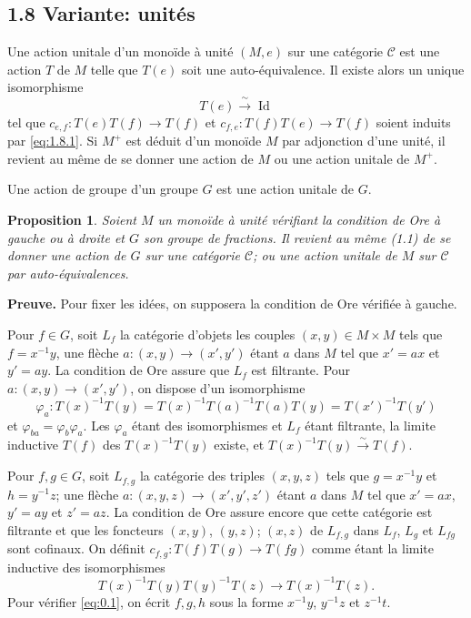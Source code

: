 \documentclass[11pt,a4paper]{article}
\theoremstyle{plain}
\newtheorem{proposition}[theorem]{Proposition}
\theoremstyle{definition}
\newcommand{\cC}{\mathscr{C}}
\begin{document}
\subsection*{1.8 Variante: unit\'es}

Une action unitale d'un mono\"ide \`a unit\'e $(M, e)$ sur une cat\'egorie $\cC$ est une action $T$ de $M$ telle que $T(e)$ soit une auto-\'equivalence. Il existe alors un unique isomorphisme
\begin{equation}\label{eq:1.8.1}
T(e) \xrightarrow{\;\sim\;} \operatorname{Id}
\tag{1.8.1}
\end{equation}
tel que $c_{e,f} : T(e)T(f) \to T(f)$ et $c_{f,e} : T(f)T(e) \to T(f)$ soient induits par \eqref{eq:1.8.1}. Si $M^+$ est d\'eduit d'un mono\"ide $M$ par adjonction d'une unit\'e, il revient au m\^eme de se donner une action de $M$ ou une action unitale de $M^+$.

Une action de groupe d'un groupe $G$ est une action unitale de $G$.

\begin{proposition}\label{prop:1.9}
Soient $M$ un mono\"ide \`a unit\'e v\'erifiant la condition de Ore \`a gauche ou \`a droite et $G$ son groupe de fractions. Il revient au m\^eme \textup{(1.1)} de se donner une action de $G$ sur une cat\'egorie $\cC$; ou une action unitale de $M$ sur $\cC$ par auto-\'equivalences.
\end{proposition}

\noindent\textbf{Preuve.} Pour fixer les id\'ees, on supposera la condition de Ore v\'erifi\'ee \`a gauche.

Pour $f \in G$, soit $L_f$ la cat\'egorie d'objets les couples $(x,y) \in M \times M$ tels que $f = x^{-1}y$, une fl\`eche $a : (x,y) \to (x',y')$ \'etant $a$ dans $M$ tel que $x' = ax$ et $y' = ay$. La condition de Ore assure que $L_f$ est filtrante. Pour $a : (x,y) \to (x',y')$, on dispose d'un isomorphisme
\[
\varphi_a : T(x)^{-1} T(y) = T(x)^{-1} T(a)^{-1} T(a) T(y) = T(x')^{-1} T(y')
\]
et $\varphi_{ba} = \varphi_b \varphi_a$. Les $\varphi_a$ \'etant des isomorphismes et $L_f$ \'etant filtrante, la limite inductive $T(f)$ des $T(x)^{-1} T(y)$ existe, et $T(x)^{-1} T(y) \xrightarrow{\;\sim\;} T(f)$.

Pour $f, g \in G$, soit $L_{f,g}$ la cat\'egorie des triples $(x,y,z)$ tels que $g = x^{-1}y$ et $h = y^{-1}z$; une fl\`eche $a : (x,y,z) \to (x',y',z')$ \'etant $a$ dans $M$ tel que $x' = ax$, $y' = ay$ et $z' = az$. La condition de Ore assure encore que cette cat\'egorie est filtrante et que les foncteurs $(x,y)$, $(y,z)$; $(x,z)$ de $L_{f,g}$ dans $L_f$, $L_g$ et $L_{fg}$ sont cofinaux. On d\'efinit $c_{f,g} : T(f)T(g) \to T(fg)$ comme \'etant la limite inductive des isomorphismes
\[
T(x)^{-1} T(y) T(y)^{-1} T(z) \to T(x)^{-1} T(z).
\]
Pour v\'erifier \eqref{eq:0.1}, on \'ecrit $f, g, h$ sous la forme $x^{-1}y$, $y^{-1}z$ et $z^{-1}t$.
\end{document}
